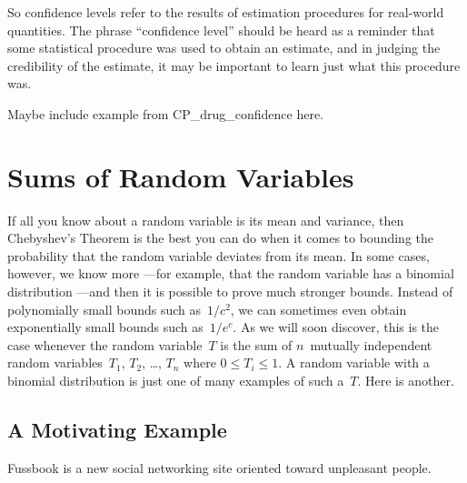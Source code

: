 So confidence levels refer to the results of estimation procedures for
real-world quantities.  The phrase ``confidence level'' should be heard as
a reminder that some statistical procedure was used to obtain an estimate,
and in judging the credibility of the estimate, it may be important to
learn just what this procedure was.

\begin{editingnotes}
Maybe include example from CP\_drug\_confidence here.
\end{editingnotes}

\begin{problems}

\classproblems
{}

\examproblems
{}

\end{problems}

\section{Sums of Random Variables}

If all you know about a random variable is its mean and variance, then
Chebyshev's Theorem is the best you can do when it comes to bounding
the probability that the random variable deviates from its mean.  In
some cases, however, we know more ---for example, that the random
variable has a binomial distribution ---and then it is possible to
prove much stronger bounds.  Instead of polynomially small bounds such
as~$1/c^2$, we can sometimes even obtain exponentially small bounds
such as~$1/e^c$.  As we will soon discover, this is the case whenever
the random variable~$T$ is the sum of $n$~mutually independent random
variables~$T_1$, $T_2$, \dots, $T_n$ where $0 \le T_i \le 1$.  A
random variable with a binomial distribution is just one of many
examples of such a~$T$.  Here is another.

\subsection{A Motivating Example}

Fussbook is a new social networking site oriented toward unpleasant
people.

